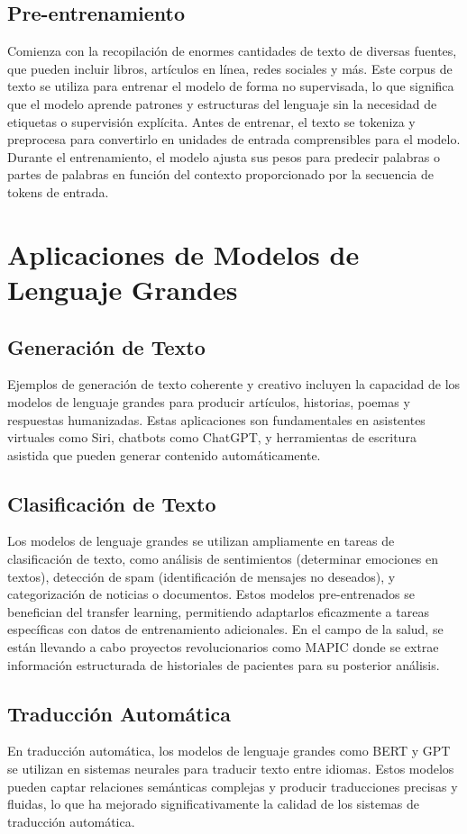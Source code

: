 \subsection{Pre-entrenamiento}
 Comienza con la recopilación de enormes cantidades de texto de diversas fuentes, que pueden incluir libros, artículos en línea, redes sociales y más. Este corpus de texto se utiliza para entrenar el modelo de forma no supervisada, lo que significa que el modelo aprende patrones y estructuras del lenguaje sin la necesidad de etiquetas o supervisión explícita. Antes de entrenar, el texto se tokeniza y preprocesa para convertirlo en unidades de entrada comprensibles para el modelo. Durante el entrenamiento, el modelo ajusta sus pesos para predecir palabras o partes de palabras en función del contexto proporcionado por la secuencia de tokens de entrada.




\section{Aplicaciones de Modelos de Lenguaje Grandes}
\subsection{Generación de Texto}
Ejemplos de generación de texto coherente y creativo incluyen la capacidad de los modelos de lenguaje grandes para producir artículos, historias, poemas y respuestas humanizadas. Estas aplicaciones son fundamentales en asistentes virtuales como Siri, chatbots como ChatGPT, y herramientas de escritura asistida que pueden generar contenido automáticamente.

\subsection{Clasificación de Texto}
Los modelos de lenguaje grandes se utilizan ampliamente en tareas de clasificación de texto, como análisis de sentimientos (determinar emociones en textos), detección de spam (identificación de mensajes no deseados), y categorización de noticias o documentos. Estos modelos pre-entrenados se benefician del transfer learning, permitiendo adaptarlos eficazmente a tareas específicas con datos de entrenamiento adicionales. En el campo de la salud, se están llevando a cabo proyectos revolucionarios como MAPIC \cite{UMA} donde se extrae información estructurada de historiales de pacientes para su posterior análisis.

\subsection{Traducción Automática}
En traducción automática, los modelos de lenguaje grandes como BERT y GPT se utilizan en sistemas neurales para traducir texto entre idiomas. Estos modelos pueden captar relaciones semánticas complejas y producir traducciones precisas y fluidas, lo que ha mejorado significativamente la calidad de los sistemas de traducción automática.

